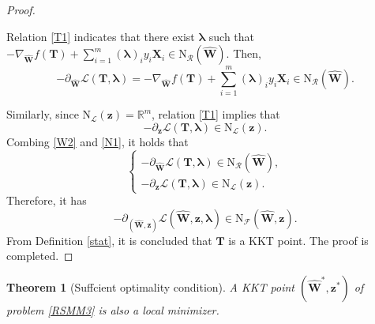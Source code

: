 \documentclass[sn-mathphys]{JORSC-jnl}%
\theoremstyle{thmstyleone}%
\newtheorem{theorem}{Theorem}%
\theoremstyle{thmstylethree}%
\theoremstyle{thmstyleone} %
\begin{document}
\begin{proof}
\begin{description}
	Relation \eqref{T1} indicates that there  exist $\bm{\lambda}$ such that $-\nabla_{\hat{\mathbf{W}}} f(\mathbf{T})+\sum_{i=1}^m(\bm{\lambda})_i y_i\mathbf{X}_i\in\mathrm{N}_{\mathcal{R}}(\hat{\mathbf{W}})$. Then,
	\begin{equation}\label{W2}
    -\partial_{\hat{\mathbf{W}}} \mathscr{L}(\mathbf{T},\bm{\lambda})= -\nabla_{\hat{\mathbf{W}}}f(\mathbf{T})+\sum_{i=1}^m(\bm{\lambda})_i y_i\mathbf{X}_i\in\mathrm{N}_{\mathcal{R}}(\hat{\mathbf{W}}).
    \end{equation}
\end{description}
Similarly, since $\mathrm{N}_{\mathcal{L}}(\mathbf{z})=\mathbb{R}^m$, relation \eqref{T1} implies that 
    	\begin{equation}\label{N1}
        -\partial_\mathbf{z} \mathscr{L}(\mathbf{T},\bm{\lambda})\in\mathrm{N}_{\mathcal{L}}(\mathbf{z}).
            \end{equation}
Combing \eqref{W2} and \eqref{N1}, it holds that
	\begin{equation*}
		\begin{cases}
			-\partial_{\hat{\mathbf{W}}} \mathscr{L}(\mathbf{T},\bm{\lambda})\in\mathrm{N}_{\mathcal{R}}(\hat{\mathbf{W}}),\\
			-\partial_\mathbf{z} \mathscr{L}(\mathbf{T},\bm{\lambda})\in\mathrm{N}_{\mathcal{L}}(\mathbf{z}).
		\end{cases} 
	\end{equation*} 	
Therefore, it has 
	\begin{equation*}
-\partial_{({\hat{\mathbf{W}},\mathbf{z}})}\mathscr{L}(\hat{\mathbf{W}},\mathbf{z},\bm{\lambda})
	\in\text{N}_{\mathcal{F}}(\hat{\mathbf{W}},\mathbf{z}).
	\end{equation*} 
From Definition \ref{stat},  it is concluded that $\mathbf{T}$ is a KKT point. The proof is completed.
\end{proof}



\begin{theorem}[Suffcient optimality condition] A KKT point $(\hat{\mathbf{W}}^*,\mathbf{z}^*)$ of problem \eqref{RSMM3} is also a local minimizer.
\end{theorem}
\end{document}

